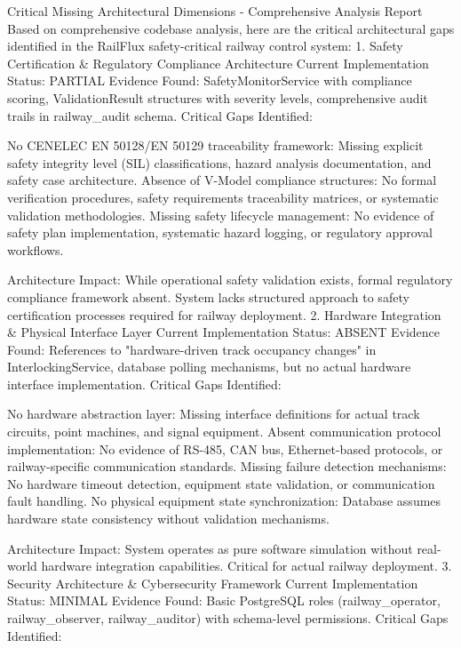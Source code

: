 Critical Missing Architectural Dimensions - Comprehensive Analysis Report
Based on comprehensive codebase analysis, here are the critical architectural gaps identified in the RailFlux safety-critical railway control system:
1. Safety Certification & Regulatory Compliance Architecture
Current Implementation Status: PARTIAL
Evidence Found: SafetyMonitorService with compliance scoring, ValidationResult structures with severity levels, comprehensive audit trails in railway_audit schema.
Critical Gaps Identified:

No CENELEC EN 50128/EN 50129 traceability framework: Missing explicit safety integrity level (SIL) classifications, hazard analysis documentation, and safety case architecture.
Absence of V-Model compliance structures: No formal verification procedures, safety requirements traceability matrices, or systematic validation methodologies.
Missing safety lifecycle management: No evidence of safety plan implementation, systematic hazard logging, or regulatory approval workflows.

Architecture Impact: While operational safety validation exists, formal regulatory compliance framework absent. System lacks structured approach to safety certification processes required for railway deployment.
2. Hardware Integration & Physical Interface Layer
Current Implementation Status: ABSENT
Evidence Found: References to "hardware-driven track occupancy changes" in InterlockingService, database polling mechanisms, but no actual hardware interface implementation.
Critical Gaps Identified:

No hardware abstraction layer: Missing interface definitions for actual track circuits, point machines, and signal equipment.
Absent communication protocol implementation: No evidence of RS-485, CAN bus, Ethernet-based protocols, or railway-specific communication standards.
Missing failure detection mechanisms: No hardware timeout detection, equipment state validation, or communication fault handling.
No physical equipment state synchronization: Database assumes hardware state consistency without validation mechanisms.

Architecture Impact: System operates as pure software simulation without real-world hardware integration capabilities. Critical for actual railway deployment.
3. Security Architecture & Cybersecurity Framework
Current Implementation Status: MINIMAL
Evidence Found: Basic PostgreSQL roles (railway_operator, railway_observer, railway_auditor) with schema-level permissions.
Critical Gaps Identified:

